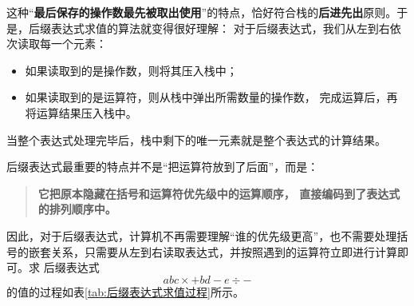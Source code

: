 这种“\textbf{最后保存的操作数最先被取出使用}”的特点，恰好符合栈的\textbf{后进先出}原则。于是，后缀表达式求值的算法就变得很好理解：
对于后缀表达式，我们从左到右依次读取每一个元素：
\begin{itemize}
    \item 如果读取到的是操作数，则将其压入栈中；
    \item 如果读取到的是运算符，则从栈中弹出所需数量的操作数，
          完成运算后，再将运算结果压入栈中。
\end{itemize}
当整个表达式处理完毕后，栈中剩下的唯一元素就是整个表达式的计算结果。

后缀表达式最重要的特点并不是“把运算符放到了后面”，而是：
\begin{quote}
\textbf{它把原本隐藏在括号和运算符优先级中的运算顺序，
直接编码到了表达式的排列顺序中。}
\end{quote}
因此，对于后缀表达式，计算机不再需要理解“谁的优先级更高”，也不需要处理括号的嵌套关系，只需要从左到右读取表达式，并按照遇到的运算符立即进行计算即可。求
后缀表达式
\[
abc\times +bd-e\div -
\]
的值的过程如表\ref{tab:后缀表达式求值过程}所示。

